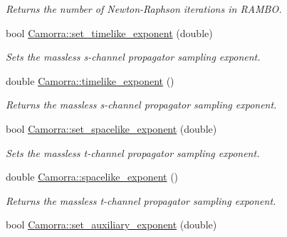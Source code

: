 \begin{DoxyCompactItemize}
\begin{DoxyCompactList}\small\item\em Returns the number of Newton-\/Raphson iterations in RAMBO. \end{DoxyCompactList}\item 
\hypertarget{a00829_a83d10ec4cad286691ac70f645fd18e97}{
bool \hyperlink{a00829_a83d10ec4cad286691ac70f645fd18e97}{Camorra::set\_\-timelike\_\-exponent} (double)}
\label{a00829_a83d10ec4cad286691ac70f645fd18e97}

\begin{DoxyCompactList}\small\item\em Sets the massless s-\/channel propagator sampling exponent. \end{DoxyCompactList}\item 
\hypertarget{a00829_a35d1bbad2438b461f5db90b09f6346bf}{
double \hyperlink{a00829_a35d1bbad2438b461f5db90b09f6346bf}{Camorra::timelike\_\-exponent} ()}
\label{a00829_a35d1bbad2438b461f5db90b09f6346bf}

\begin{DoxyCompactList}\small\item\em Returns the massless s-\/channel propagator sampling exponent. \end{DoxyCompactList}\item 
\hypertarget{a00829_a609c44713326ebf87fccec004210c119}{
bool \hyperlink{a00829_a609c44713326ebf87fccec004210c119}{Camorra::set\_\-spacelike\_\-exponent} (double)}
\label{a00829_a609c44713326ebf87fccec004210c119}

\begin{DoxyCompactList}\small\item\em Sets the massless t-\/channel propagator sampling exponent. \end{DoxyCompactList}\item 
\hypertarget{a00829_a287ab4732362246bdd4b763bd22e957f}{
double \hyperlink{a00829_a287ab4732362246bdd4b763bd22e957f}{Camorra::spacelike\_\-exponent} ()}
\label{a00829_a287ab4732362246bdd4b763bd22e957f}

\begin{DoxyCompactList}\small\item\em Returns the massless t-\/channel propagator sampling exponent. \end{DoxyCompactList}\item 
\hypertarget{a00829_af52f468c513e336f4721ffa4e9bc5e0f}{
bool \hyperlink{a00829_af52f468c513e336f4721ffa4e9bc5e0f}{Camorra::set\_\-auxiliary\_\-exponent} (double)}
\label{a00829_af52f468c513e336f4721ffa4e9bc5e0f}


\end{DoxyCompactItemize}
